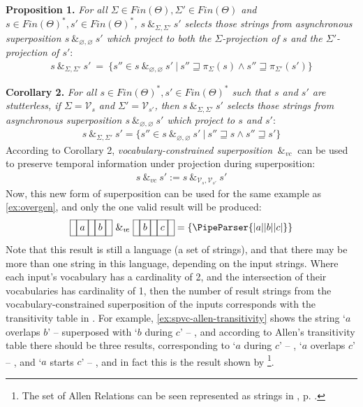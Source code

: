 \documentclass[a4paper,12pt,leqno]{article}
\newcommand{\vph}[1]{\vphantom{#1}}
\newcommand{\ebox}[1]{\fbox{$\vph{'(),}#1$}}
\newcommand{\nbBefore}[2]{\ebox{#1}\ebox{}\ebox{#2}}
\newcommand{\nbOverlaps}[2]{\ebox{#1}\ebox{#1,#2}\ebox{#2}}
\newcommand{\nbDuring}[2]{\ebox{#2}\ebox{#1,#2}\ebox{#2}}
\newcommand{\nbStarts}[2]{\ebox{#1,#2}\ebox{#2}}
\newcommand{\Before}[2]{\ebox{}\nbBefore{#1}{#2}\ebox{}}
\newcommand{\Overlaps}[2]{\ebox{}\nbOverlaps{#1}{#2}\ebox{}}
\newcommand{\During}[2]{\ebox{}\nbDuring{#1}{#2}\ebox{}}
\newcommand{\Starts}[2]{\ebox{}\nbStarts{#1}{#2}\ebox{}}
\newcommand{\cOverlaps}[2]{`$#1$ overlaps $#2$' -- \Overlaps{#1}{#2}}
\newcommand{\cDuring}[2]{`$#1$ during $#2$' -- \During{#1}{#2}}
\newcommand{\cStarts}[2]{`$#1$ starts $#2$' -- \Starts{#1}{#2}}
\newcommand{\spsigma}[1][\Sigma, \Sigma']{~\&_{#1}~}
\newcommand{\spvc}{~\&_{v\!c}~}
\newcommand{\V}{\mathcal{V}}
\renewcommand{\emptyset}{\varnothing}
\newcommand{\EventString}[1]{%
	\renewcommand*{\do}[1]{\ebox{##1}}%
	\PipeParser{#1}%
}
\begin{document}
\noindent
\textbf{Proposition 1.} {\sl For all $\Sigma \in Fin(\Theta), \Sigma' \in Fin(\Theta)$ and $s \in Fin(\Theta)^*, s' \in Fin(\Theta)^*$, $s \spsigma s'$ selects those strings from asynchronous superposition $s \spsigma[\emptyset, \emptyset] s'$ which project to both the $\Sigma$-projection of $s$ and the $\Sigma'$-projection of $s'$}:
\begin{align}
s \spsigma s' ~=~ \{s'' \in s \spsigma[\emptyset, \emptyset] s' ~|~
s'' \sqsupseteq \pi_{\Sigma}(s) \wedge s'' \sqsupseteq \pi_{\Sigma'}(s')\}
\end{align}

\noindent
\textbf{Corollary 2.} {\sl For all $s \in Fin(\Theta)^*, s' \in Fin(\Theta)^*$ such that $s$ and $s'$ are stutterless, if $\Sigma = \V_s$ and $\Sigma' =\V_{s'}$, then $s \spsigma s'$ selects those strings from asynchronous superposition $s \spsigma[\emptyset, \emptyset] s'$ which project to $s$ and $s'$}:
\begin{align}
s \spsigma s' = \{s''\in s \spsigma[\emptyset, \emptyset] s' ~|~ s'' \sqsupseteq s \wedge s'' \sqsupseteq s'\}
\end{align}
\doublespacing
According to Corollary 2, \textit{vocabulary-constrained superposition} $\spvc$ can be used to preserve temporal information under projection during superposition:
\begin{align}\label{def:vc-superposition}
s \spvc s' :=  s \spsigma[\V_s, \V_{s'}] s'
\end{align}
Now, this new form of superposition can be used for the same example as \cref{ex:overgen}, and only the one valid result will be produced:
\begin{align}
	\Before{a}{b} \spvc \Before{b}{c} = \{\EventString{{}|a|{}|b|{}|c|{}}\}
\end{align}
Note that this result is still a language (a set of strings), and that there may be more than one string in this language, depending on the input strings. Where each input's vocabulary has a cardinality of 2, and the intersection of their vocabularies has cardinality of 1, then the number of result strings from the vocabulary-constrained superposition of the inputs corresponds with the transitivity table in \citet[Fig. 4]{allen1983maintaining}. For example, \cref{ex:spvc-allen-transitivity} shows the string \cOverlaps{a}{b} superposed with \cDuring{b}{c}, and according to Allen's transitivity table there should be three results, corresponding to \cDuring{a}{c}, \cOverlaps{a}{c}, and \cStarts{a}{c}, and in fact this is the result shown by \footnote{The set of Allen Relations can be seen represented as strings in , p. \pageref{tab:allen-rels-strings}.}.
\end{document}
